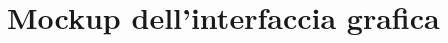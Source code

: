 \documentclass[../SpecificaTecnica.tex]{subfiles}
\begin{document}
\section{Mockup dell'interfaccia grafica}
\end{document}
